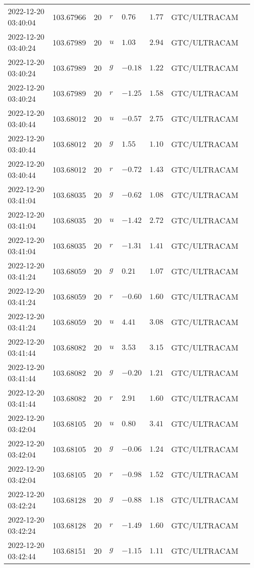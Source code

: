 \documentclass{nature_plusfigure}
\begin{document}
\begin{supplement}
\begin{center}
\begin{longtable}{llllllll}
2022-12-20 03:40:04 & 103.67966 & 20 & $r$ & $0.76$ & $1.77$ & GTC/ULTRACAM &  \\ 
2022-12-20 03:40:24 & 103.67989 & 20 & $u$ & $1.03$ & $2.94$ & GTC/ULTRACAM &  \\ 
2022-12-20 03:40:24 & 103.67989 & 20 & $g$ & $-0.18$ & $1.22$ & GTC/ULTRACAM &  \\ 
2022-12-20 03:40:24 & 103.67989 & 20 & $r$ & $-1.25$ & $1.58$ & GTC/ULTRACAM &  \\ 
2022-12-20 03:40:44 & 103.68012 & 20 & $u$ & $-0.57$ & $2.75$ & GTC/ULTRACAM &  \\ 
2022-12-20 03:40:44 & 103.68012 & 20 & $g$ & $1.55$ & $1.10$ & GTC/ULTRACAM &  \\ 
2022-12-20 03:40:44 & 103.68012 & 20 & $r$ & $-0.72$ & $1.43$ & GTC/ULTRACAM &  \\ 
2022-12-20 03:41:04 & 103.68035 & 20 & $g$ & $-0.62$ & $1.08$ & GTC/ULTRACAM &  \\ 
2022-12-20 03:41:04 & 103.68035 & 20 & $u$ & $-1.42$ & $2.72$ & GTC/ULTRACAM &  \\ 
2022-12-20 03:41:04 & 103.68035 & 20 & $r$ & $-1.31$ & $1.41$ & GTC/ULTRACAM &  \\ 
2022-12-20 03:41:24 & 103.68059 & 20 & $g$ & $0.21$ & $1.07$ & GTC/ULTRACAM &  \\ 
2022-12-20 03:41:24 & 103.68059 & 20 & $r$ & $-0.60$ & $1.60$ & GTC/ULTRACAM &  \\ 
2022-12-20 03:41:24 & 103.68059 & 20 & $u$ & $4.41$ & $3.08$ & GTC/ULTRACAM &  \\ 
2022-12-20 03:41:44 & 103.68082 & 20 & $u$ & $3.53$ & $3.15$ & GTC/ULTRACAM &  \\ 
2022-12-20 03:41:44 & 103.68082 & 20 & $g$ & $-0.20$ & $1.21$ & GTC/ULTRACAM &  \\ 
2022-12-20 03:41:44 & 103.68082 & 20 & $r$ & $2.91$ & $1.60$ & GTC/ULTRACAM &  \\ 
2022-12-20 03:42:04 & 103.68105 & 20 & $u$ & $0.80$ & $3.41$ & GTC/ULTRACAM &  \\ 
2022-12-20 03:42:04 & 103.68105 & 20 & $g$ & $-0.06$ & $1.24$ & GTC/ULTRACAM &  \\ 
2022-12-20 03:42:04 & 103.68105 & 20 & $r$ & $-0.98$ & $1.52$ & GTC/ULTRACAM &  \\ 
2022-12-20 03:42:24 & 103.68128 & 20 & $g$ & $-0.88$ & $1.18$ & GTC/ULTRACAM &  \\ 
2022-12-20 03:42:24 & 103.68128 & 20 & $r$ & $-1.49$ & $1.60$ & GTC/ULTRACAM &  \\ 
2022-12-20 03:42:44 & 103.68151 & 20 & $g$ & $-1.15$ & $1.11$ & GTC/ULTRACAM &  \\ 

\end{longtable}
\end{center}
\end{supplement}
\end{document}
